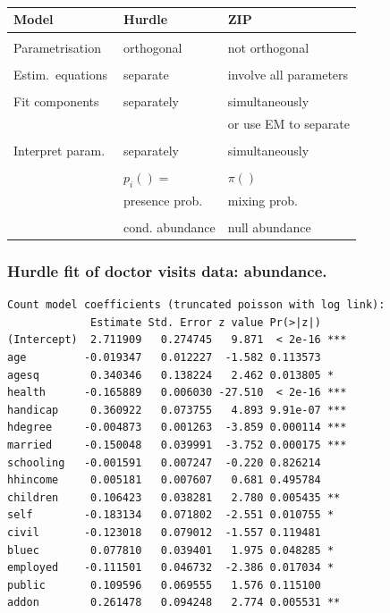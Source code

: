 \documentclass{beamer}
\begin{document}
\begin{frame}
\frametitle{}
\begin{tabular}{l|l|l}
Model & Hurdle & ZIP\\
\hline
&&\\
Parametrisation & orthogonal & not orthogonal \\
&&\\
Estim.\ equations & separate & involve all parameters \\
&&\\
Fit components & separately & simultaneously \\ 
&& or use EM to separate\\
&&\\
Interpret param.\ & separately & simultaneously\\
&&\\
& $p_i()=$ & $\pi()$\\
& presence prob.\ & mixing prob.\ \\
&&\\
& cond. abundance & null abundance 
\end{tabular}
\end{frame}


\begin{frame}[fragile]
\frametitle{Hurdle fit of doctor visits data: abundance.}

{\scriptsize
\begin{verbatim}
Count model coefficients (truncated poisson with log link):
             Estimate Std. Error z value Pr(>|z|)    
(Intercept)  2.711909   0.274745   9.871  < 2e-16 ***
age         -0.019347   0.012227  -1.582 0.113573    
agesq        0.340346   0.138224   2.462 0.013805 *  
health      -0.165889   0.006030 -27.510  < 2e-16 ***
handicap     0.360922   0.073755   4.893 9.91e-07 ***
hdegree     -0.004873   0.001263  -3.859 0.000114 ***
married     -0.150048   0.039991  -3.752 0.000175 ***
schooling   -0.001591   0.007247  -0.220 0.826214    
hhincome     0.005181   0.007607   0.681 0.495784    
children     0.106423   0.038281   2.780 0.005435 ** 
self        -0.183134   0.071802  -2.551 0.010755 *  
civil       -0.123018   0.079012  -1.557 0.119481    
bluec        0.077810   0.039401   1.975 0.048285 *  
employed    -0.111501   0.046732  -2.386 0.017034 *  
public       0.109596   0.069555   1.576 0.115100    
addon        0.261478   0.094248   2.774 0.005531 ** 
\end{verbatim}
}

\end{frame}
\end{document}
